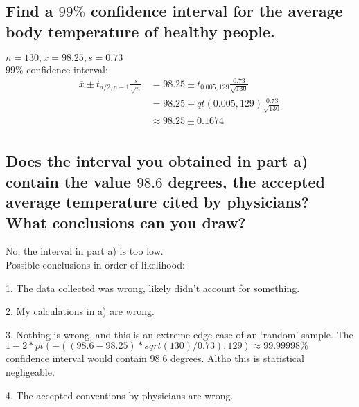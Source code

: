 \documentclass[10pt, letterpaper, titlepage]{article}
\newcommand\mx{\overline{x}}
\begin{document}
        \subsection{Find a $99\%$ confidence interval for the average body temperature of healthy people.}
            $n = 130, \mx = 98.25, s = 0.73$\\
            $99\%$ confidence interval:
            \begin{align*}
                \mx \pm t_{a/2, n - 1} \frac{s}{\sqrt{n}}
                &= 98.25 \pm t_{0.005, 129} \frac{0.73}{\sqrt{130}}\\
                &= 98.25 \pm qt(0.005, 129) \frac{0.73}{\sqrt{130}}\\
                &\approx 98.25 \pm 0.1674\\
            \end{align*}
            
        \subsection{Does the interval you obtained in part a) contain the value $98.6$ degrees, the
            accepted average temperature cited by physicians? What conclusions can you
            draw?}
            No, the interval in part a) is too low.\\
            Possible conclusions in order of likelihood:
            \begin{description}
                \item 1. The data collected was wrong, likely didn't account for something.
                \item 2. My calculations in a) are wrong.
                \item 3. Nothing is wrong, and this is an extreme edge case of an `random' sample. 
                    The \\
                    $1 - 2 * pt(-((98.6-98.25) * sqrt(130) / 0.73), 129) \approx 99.99998\%$ 
                    confidence interval would contain $98.6$ degrees. 
                    Altho this is statistical negligeable.
                \item 4. The accepted conventions by physicians are wrong.
            \end{description}

    \newpage
\end{document}
